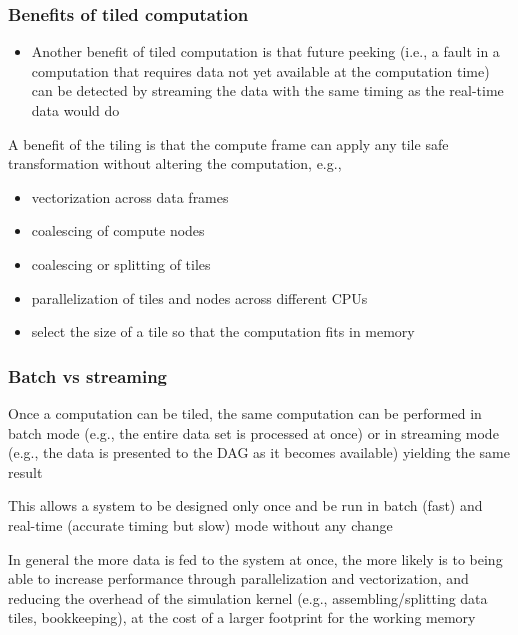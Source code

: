 \documentclass[11pt, reqno]{amsart}
\theoremstyle{definition}
\theoremstyle{remark}
\begin{document}
  \subsubsection{Benefits of tiled computation}

  \begin{itemize}
    \item Another benefit of tiled computation is that future peeking (i.e., a
      fault in a computation that requires data not yet available at the
      computation time) can be detected by streaming the data with the same timing
      as the real-time data would do
  \end{itemize}

  A benefit of the tiling is that the compute frame can apply any tile safe transformation
  without altering the computation, e.g.,

  \begin{itemize}
    \item vectorization across data frames

    \item coalescing of compute nodes

    \item coalescing or splitting of tiles

    \item parallelization of tiles and nodes across different CPUs

    \item select the size of a tile so that the computation fits in memory
  \end{itemize}

  \subsubsection{Batch vs streaming}

  Once a computation can be tiled, the same computation can be performed in
  batch mode (e.g., the entire data set is processed at once) or in streaming
  mode (e.g., the data is presented to the DAG as it becomes available) yielding
  the same result

  This allows a system to be designed only once and be run in batch (fast) and real-time
  (accurate timing but slow) mode without any change

  In general the more data is fed to the system at once, the more likely is to being
  able to increase performance through parallelization and vectorization, and
  reducing the overhead of the simulation kernel (e.g., assembling/splitting data
  tiles, bookkeeping), at the cost of a larger footprint for the working memory
\end{document}
